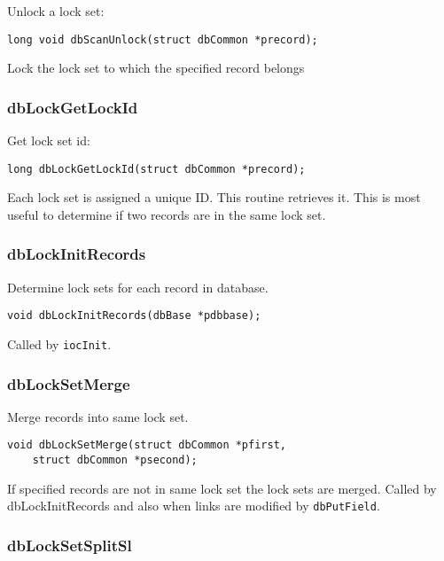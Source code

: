 Unlock a lock set:

\begin{verbatim}
long void dbScanUnlock(struct dbCommon *precord);
\end{verbatim}

Lock the lock set to which the specified record belongs

\subsubsection{dbLockGetLockId}

Get lock set id:

\begin{verbatim}
long dbLockGetLockId(struct dbCommon *precord);
\end{verbatim}

Each lock set is assigned a unique ID. This routine retrieves it. This is most useful to determine if two records are in the 
same lock set.

\subsubsection{dbLockInitRecords}

Determine lock sets for each record in database.

\begin{verbatim}
void dbLockInitRecords(dbBase *pdbbase);
\end{verbatim}

Called by \verb|iocInit|.

\subsubsection{dbLockSetMerge}

Merge records into same lock set.

\begin{verbatim}
void dbLockSetMerge(struct dbCommon *pfirst,
    struct dbCommon *psecond);
\end{verbatim}

If specified records are not in same lock set the lock sets are merged. Called by dbLockInitRecords and also when links 
are modified by \verb|dbPutField|.

\subsubsection{dbLockSetSplitSl}

